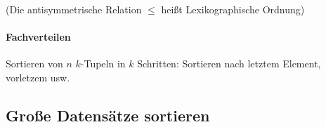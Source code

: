(Die antisymmetrische Relation $\leq$ hei\ss t Lexikographische Ordnung)

\paragraph{Fachverteilen}
Sortieren von $n$ $k$-Tupeln in $k$ Schritten: Sortieren nach letztem Element, vorletzem usw.

\subsection{Gro\ss e Datensätze sortieren}


\mzBreak\

